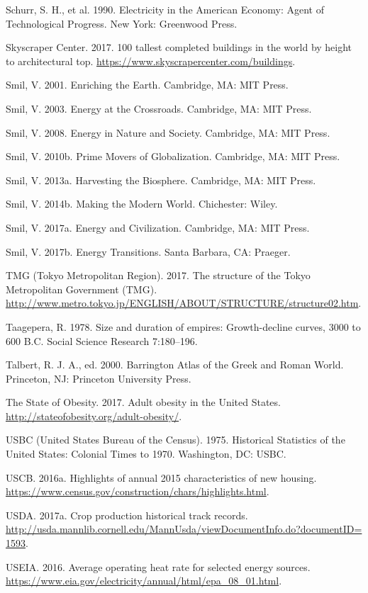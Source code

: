 \documentclass[aps,rmp,preprint,superscriptaddress,10pt,onecolumn]{article}
\begin{document}
Schurr, S. H., et al. 1990. Electricity in the American Economy: Agent of Technological Progress. New York: Greenwood Press.\par
Skyscraper Center. 2017. 100 tallest completed buildings in the world by height to architectural top. \url{https://www.skyscrapercenter.com/buildings}.\par
Smil, V. 2001. Enriching the Earth. Cambridge, MA: MIT Press.\par
Smil, V. 2003. Energy at the Crossroads. Cambridge, MA: MIT Press.\par
Smil, V. 2008. Energy in Nature and Society. Cambridge, MA: MIT Press.\par
Smil, V. 2010b. Prime Movers of Globalization. Cambridge, MA: MIT Press.\par
Smil, V. 2013a. Harvesting the Biosphere. Cambridge, MA: MIT Press.\par
Smil, V. 2014b. Making the Modern World. Chichester: Wiley.\par
Smil, V. 2017a. Energy and Civilization. Cambridge, MA: MIT Press.\par
Smil, V. 2017b. Energy Transitions. Santa Barbara, CA: Praeger.\par
TMG (Tokyo Metropolitan Region). 2017. The structure of the Tokyo Metropolitan Government (TMG). \url{http://www.metro.tokyo.jp/ENGLISH/ABOUT/STRUCTURE/structure02.htm}.\par
Taagepera, R. 1978. Size and duration of empires: Growth-decline curves, 3000 to 600 B.C. Social Science Research 7:180–196.\par
Talbert, R. J. A., ed. 2000. Barrington Atlas of the Greek and Roman World. Princeton, NJ: Princeton University Press.\par
The State of Obesity. 2017. Adult obesity in the United States. \url{http://stateofobesity.org/adult-obesity/}.\par
USBC (United States Bureau of the Census). 1975. Historical Statistics of the United States: Colonial Times to 1970. Washington, DC: USBC.\par
USCB. 2016a. Highlights of annual 2015 characteristics of new housing. \url{https://www.census.gov/construction/chars/highlights.html}.\par
USDA. 2017a. Crop production historical track records. \url{http://usda.mannlib.cornell.edu/MannUsda/viewDocumentInfo.do?documentID​=​1593}.\par
USEIA. 2016. Average operating heat rate for selected energy sources. \url{https://www.eia.gov/electricity/annual/html/epa_08_01.html}.\par
\end{document}
